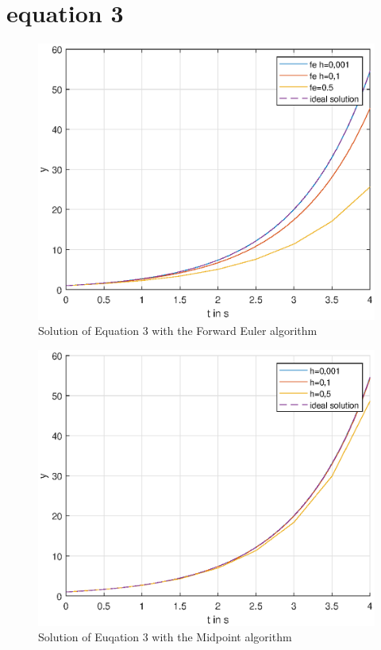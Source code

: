 \section{equation 3}
\begin{figure}[H]
    \centering
    \includegraphics[width=\plotwidth]{plots/fe_only_equation_3.eps}
    \caption{Solution of Equation 3 with the Forward Euler algorithm}
    \label{fig:eq3_fe_only}
\end{figure}

\begin{figure}[H]
    \centering
    \includegraphics[width=\plotwidth]{plots/rk_only_equation_3.eps}
    \caption{Solution of Euqation 3 with the Midpoint algorithm}
    \label{fig:eq3_rk_only}
\end{figure}

